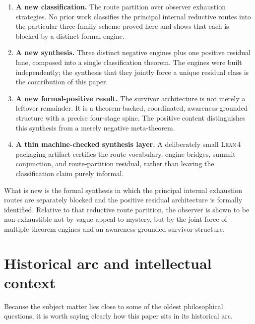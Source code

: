 \documentclass[11pt]{article}
\theoremstyle{plain}
\theoremstyle{definition}
\theoremstyle{remark}
\newcommand{\Lean}{\textsc{Lean\,4}}
\begin{document}
\begin{enumerate}[label=(\arabic*),leftmargin=2.2em]
\item \textbf{A new classification.}
      The route partition over observer exhaustion strategies.  No prior
      work classifies the principal internal reductive routes into the
      particular three-family scheme proved here and shows that each is
      blocked by a distinct formal engine.

\item \textbf{A new synthesis.}
      Three distinct negative engines plus one positive residual lane,
      composed into a single classification theorem.  The engines were
      built independently; the synthesis that they jointly force a unique
      residual class is the contribution of this paper.

\item \textbf{A new formal-positive result.}
      The survivor architecture is not merely a leftover remainder.  It is
      a theorem-backed, coordinated, awareness-grounded structure with a
      precise four-stage spine.  The positive content distinguishes this
      synthesis from a merely negative meta-theorem.

\item \textbf{A thin machine-checked synthesis layer.}
      A deliberately small \Lean{} packaging artifact certifies the route
      vocabulary, engine bridges, summit conjunction, and route-partition
      residual, rather than leaving the classification claim purely
      informal.
\end{enumerate}

\begin{keybox}[title={The novelty is the synthesis}]
What is new is the formal synthesis in which the principal internal
exhaustion routes are separately blocked and the positive residual
architecture is formally identified.  Relative to that reductive route
partition, the observer is shown to be non-exhaustible not by vague appeal
to mystery, but by the joint force of multiple theorem engines and an
awareness-grounded survivor structure.
\end{keybox}

\section{Historical arc and intellectual context}

Because the subject matter lies close to some of the oldest philosophical
questions, it is worth saying clearly how this paper sits in its
historical arc.
\end{document}
